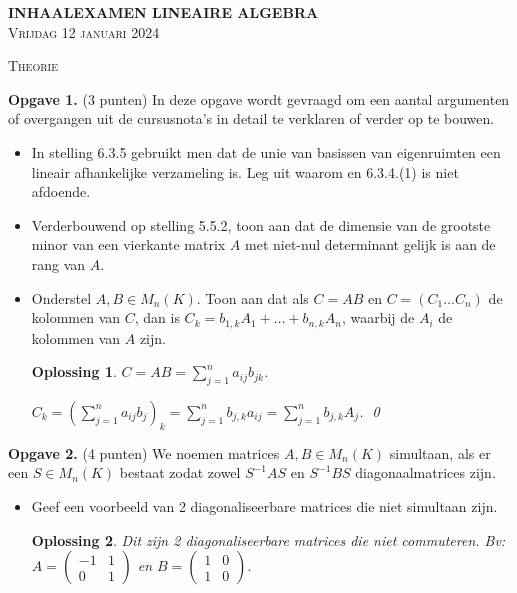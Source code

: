 \documentclass[a4paper,12pt]{article}
\newtheorem{oplossing}{Oplossing}
\begin{document}
\begin{enumerate}
\begin{center}
    \Large\textbf{INHAALEXAMEN LINEAIRE ALGEBRA} \\[0.5cm]
    \large\textsc{Vrijdag 12 januari 2024} \\[0.5cm]
\end{center}

\vspace{1cm}

\begin{center}
    \textsc{Theorie}
\end{center}

\textbf{Opgave 1.} (3 punten) In deze opgave wordt gevraagd om een aantal argumenten of overgangen uit de cursusnota's in detail te verklaren of verder op te bouwen.
\begin{itemize}
    \item[(i)] In stelling 6.3.5 gebruikt men dat de unie van basissen van eigenruimten een lineair afhankelijke verzameling is. Leg uit waarom en 6.3.4.(1) is niet afdoende.
    \item[(ii)] Verderbouwend op stelling 5.5.2, toon aan dat de dimensie van de grootste minor van een vierkante matrix $A$ met niet-nul determinant gelijk is aan de rang van $A$.
    \item[(iii)] Onderstel $A, B \in M_n(K)$. Toon aan dat als $C = AB$ en $C = (C_1 \dots C_n)$ de kolommen van $C$, dan is $C_k = b_{1,k}A_1 + \dots + b_{n,k}A_n$, waarbij de $A_i$ de kolommen van $A$ zijn.
    \begin{oplossing}
        \(C = AB = \sum_{j=1}^{n} a_{ij}b_{jk}\).

        \(C_k 
        = \left(\sum_{j=1}^{n} a_{ij}b_{j}\right)_k  
        = \sum_{j=1}^{n} b_{j,k}a_{ij}
        = \sum_{j=1}^{n} b_{j,k}A_j\). \qed
    \end{oplossing}
\end{itemize}

\vspace{0.5cm}

\textbf{Opgave 2.} (4 punten) We noemen matrices $A, B \in M_n(K)$ simultaan, als er een $S \in M_n(K)$ bestaat zodat zowel $S^{-1}AS$ en $S^{-1}BS$ diagonaalmatrices zijn.
\begin{itemize}
    \item[(i)] Geef een voorbeeld van 2 diagonaliseerbare matrices die niet simultaan zijn.
    \begin{oplossing}
        Dit zijn 2 diagonaliseerbare matrices die niet commuteren.
        Bv:
        \(
        A = \begin{pmatrix}
            -1 & 1 \\
            0 & 1
        \end{pmatrix}
        \)
        en 
        \(
        B = \begin{pmatrix}
            1 & 0 \\
            1 & 0
        \end{pmatrix}
        \).


\end{oplossing}
\end{itemize}
\end{enumerate}
\end{document}

